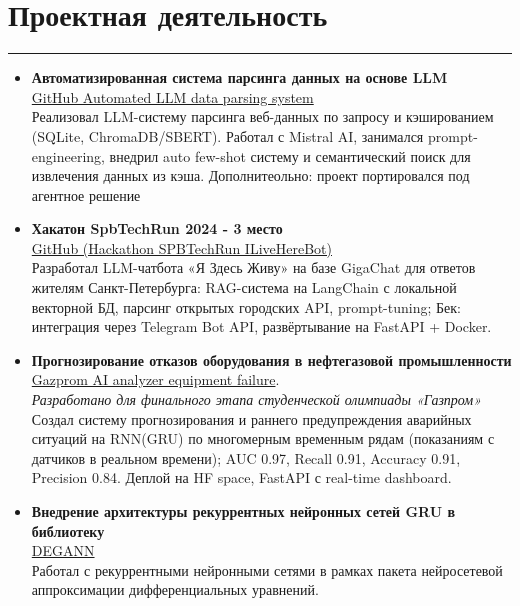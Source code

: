 \documentclass[a4paper,14pt]{article}
\begin{document}
\section*{Проектная деятельность}
\hrule
\vspace{0.5em}
\begin{itemize}

\item \textbf{Автоматизированная система парсинга данных на основе LLM}\\ \href{https://github.com/Denigmma/Automated_LLM_data_parsing_system}{GitHub Automated LLM data parsing system}\\
Реализовал LLM-систему парсинга веб-данных по запросу и кэшированием (SQLite, ChromaDB/SBERT). Работал с Mistral AI, занимался prompt-engineering, внедрил auto few-shot систему и семантический поиск для извлечения данных из кэша. Дополнитеольно: проект портировался под агентное решение


\item \textbf{Хакатон SpbTechRun 2024 - 3 место} \\ \href{https://github.com/Denigmma/Hackathon_SPBTechRun_ILiveHereBot}{GitHub (Hackathon SPBTechRun ILiveHereBot)} \\
Разработал LLM-чатбота «Я Здесь Живу» на базе GigaChat для ответов жителям Санкт-Петербурга: RAG-система на LangChain с локальной векторной БД, парсинг открытых городских API, prompt-tuning; Бек: интеграция через Telegram Bot API, развёртывание на FastAPI + Docker.

\item \textbf{Прогнозирование отказов оборудования в нефтегазовой промышленности} \\
\href{https://github.com/Denigmma/Gazprom_AI_analyzer_equipment_failure}{Gazprom AI analyzer equipment failure}.\\
\textit{Разработано для финального этапа студенческой олимпиады «Газпром»}\\
Создал систему прогнозирования и раннего предупреждения аварийных ситуаций на RNN(GRU) по многомерным временным рядам (показаниям с датчиков в реальном времени); AUC 0.97, Recall 0.91, Accuracy 0.91, Precision 0.84.
Деплой на HF space, FastAPI с real-time dashboard.



\item \textbf{Внедрение архитектуры рекуррентных нейронных сетей GRU в библиотеку}\\ \href{https://github.com/Krekep/degann}{DEGANN}\\
    Работал с рекуррентными нейронными сетями в рамках пакета нейросетевой аппроксимации дифференциальных уравнений.

\end{itemize}
\end{document}
